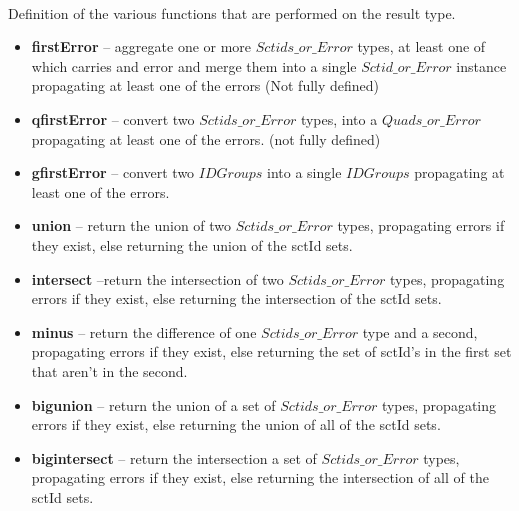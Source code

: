 \documentclass{article}
\begin{document}
\paragraph{}
Definition of the various functions that are performed on the result type. \\
\begin{itemize}[noitemsep,nolistsep]
\item \textbf{firstError} -- aggregate one or more $Sctids\_or\_Error$ types, at least one of which carries and error and merge them into a single $Sctid\_or\_Error$ instance propagating at least one of the errors (Not fully defined)
\item \textbf{qfirstError} -- convert two $Sctids\_or\_Error$ types, into a $Quads\_or\_Error$ propagating at least one of the errors. (not fully defined)
\item \textbf{gfirstError} -- convert two $IDGroups$ into a single $IDGroups$ propagating at least one of the errors.
\end{itemize}

\begin{itemize}[noitemsep]
\item \textbf{union} -- return the union of two $Sctids\_or\_Error$ types, propagating errors if they exist, else returning the union of the sctId sets.
\item \textbf{intersect} --return the intersection of two $Sctids\_or\_Error$ types, propagating errors if they exist, else returning the intersection of the sctId sets.
\item \textbf{minus} -- return the difference of one $Sctids\_or\_Error$ type and a second, propagating errors if they exist, else returning the set of sctId's in the first set that aren't in the second. 
\item \textbf{bigunion} -- return the union of a set of $Sctids\_or\_Error$ types, propagating errors if they exist, else returning the union of  all of the sctId sets.
\item \textbf{bigintersect} -- return the intersection a set of $Sctids\_or\_Error$ types, propagating errors if they exist, else returning the intersection of all of  the sctId sets.
\end{itemize}
\end{document}
